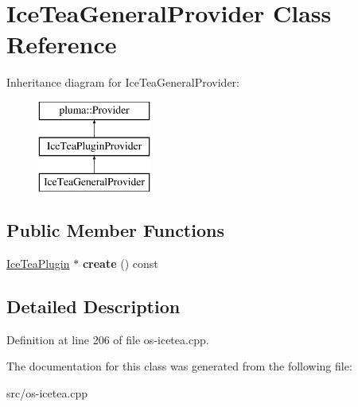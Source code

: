 \hypertarget{class_ice_tea_general_provider}{}\section{Ice\+Tea\+General\+Provider Class Reference}
\label{class_ice_tea_general_provider}
Inheritance diagram for Ice\+Tea\+General\+Provider\+:\begin{figure}[H]
\begin{center}
\leavevmode
\includegraphics[height=3.000000cm]{class_ice_tea_general_provider}
\end{center}
\end{figure}
\subsection*{Public Member Functions}
\begin{DoxyCompactItemize}
\item 
\hyperlink{class_ice_tea_plugin}{Ice\+Tea\+Plugin} $\ast$ {\bfseries create} () const \hypertarget{class_ice_tea_general_provider_a65fcb0462c1117587956d9e5c8e6dbe0}{}\label{class_ice_tea_general_provider_a65fcb0462c1117587956d9e5c8e6dbe0}

\end{DoxyCompactItemize}


\subsection{Detailed Description}


Definition at line 206 of file os-\/icetea.\+cpp.



The documentation for this class was generated from the following file\+:\begin{DoxyCompactItemize}
\item 
src/os-\/icetea.\+cpp\end{DoxyCompactItemize}
